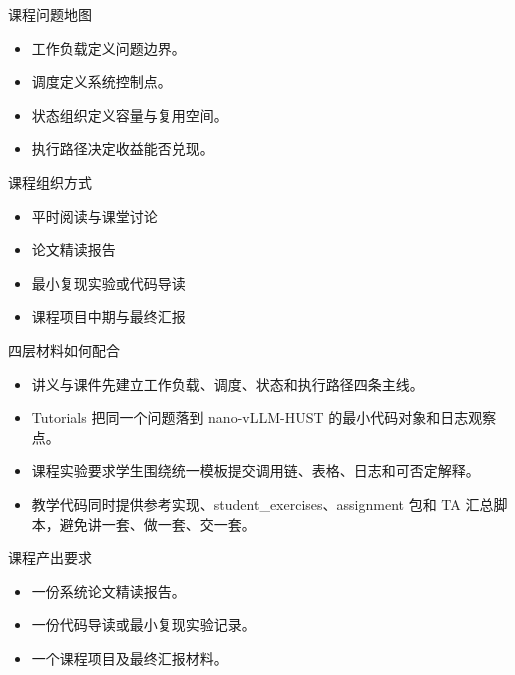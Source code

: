 \begin{frame}{课程问题地图}
  \begin{itemize}
    \item 工作负载定义问题边界。
    \item 调度定义系统控制点。
    \item 状态组织定义容量与复用空间。
    \item 执行路径决定收益能否兑现。
  \end{itemize}
\end{frame}

\begin{frame}{课程组织方式}
  \begin{itemize}
    \item 平时阅读与课堂讨论
    \item 论文精读报告
    \item 最小复现实验或代码导读
    \item 课程项目中期与最终汇报
  \end{itemize}
\end{frame}

\begin{frame}{四层材料如何配合}
  \begin{itemize}
    \item 讲义与课件先建立工作负载、调度、状态和执行路径四条主线。
    \item Tutorials 把同一个问题落到 nano-vLLM-HUST 的最小代码对象和日志观察点。
    \item 课程实验要求学生围绕统一模板提交调用链、表格、日志和可否定解释。
    \item 教学代码同时提供参考实现、student\_exercises、assignment 包和 TA 汇总脚本，避免讲一套、做一套、交一套。
  \end{itemize}
\end{frame}

\begin{frame}{课程产出要求}
  \begin{itemize}
    \item 一份系统论文精读报告。
    \item 一份代码导读或最小复现实验记录。
    \item 一个课程项目及最终汇报材料。
  \end{itemize}
\end{frame}

